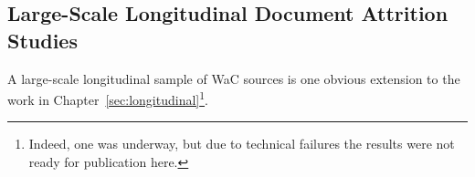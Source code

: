 





%





\subsection{Large-Scale Longitudinal Document Attrition Studies}
A large-scale longitudinal sample of WaC sources is one obvious extension to the work in Chapter~\ref{sec:longitudinal}\footnote{Indeed, one was underway, but due to technical failures the results were not ready for publication here.}.

